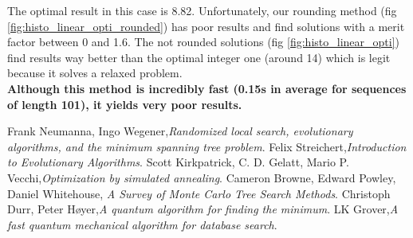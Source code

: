\documentclass[a4paper,11pt,openany]{article}
\begin{document}
\noindent
The optimal result in this case is 8.82. Unfortunately, our rounding method (fig \ref{fig:histo_linear_opti_rounded}) has poor results and find solutions with a merit factor between 0 and 1.6. The not rounded solutions (fig \ref{fig:histo_linear_opti}) find results way better than the optimal integer one (around 14) which is legit because it solves a relaxed problem.\\
\textbf{Although this method is incredibly fast (0.15s in average for sequences of length 101), it yields very poor results.}

\begin{thebibliography}{999}

Frank Neumanna, Ingo Wegener,\emph{Randomized local search, evolutionary algorithms, and the minimum spanning tree problem}.  
Felix Streichert,\emph{Introduction to Evolutionary Algorithms}. 
Scott Kirkpatrick, C. D. Gelatt, Mario P. Vecchi,\emph{Optimization by simulated annealing}.
Cameron Browne, Edward Powley, Daniel Whitehouse,\emph{ A Survey of Monte Carlo Tree Search Methods}.  
Christoph Durr, Peter Høyer,\emph{A quantum algorithm for finding the minimum}.   
LK Grover,\emph{A fast quantum mechanical algorithm for database search}. 
\end{thebibliography}
\end{document}
